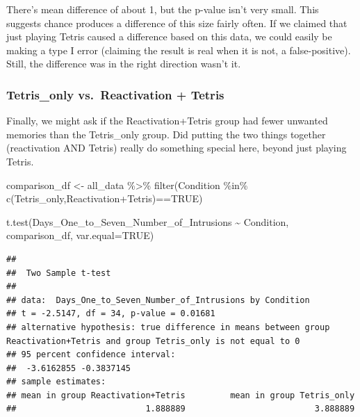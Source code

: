 \documentclass[
]{book}
\newenvironment{Shaded}{\begin{snugshade}}{\end{snugshade}}
\newcommand{\AttributeTok}[1]{\textcolor[rgb]{0.77,0.63,0.00}{#1}}
\newcommand{\ConstantTok}[1]{\textcolor[rgb]{0.00,0.00,0.00}{#1}}
\newcommand{\FunctionTok}[1]{\textcolor[rgb]{0.00,0.00,0.00}{#1}}
\newcommand{\NormalTok}[1]{#1}
\newcommand{\OtherTok}[1]{\textcolor[rgb]{0.56,0.35,0.01}{#1}}
\newcommand{\SpecialCharTok}[1]{\textcolor[rgb]{0.00,0.00,0.00}{#1}}
\newcommand{\StringTok}[1]{\textcolor[rgb]{0.31,0.60,0.02}{#1}}
\begin{document}
There's mean difference of about 1, but the p-value isn't very small. This suggests chance produces a difference of this size fairly often. If we claimed that just playing Tetris caused a difference based on this data, we could easily be making a type I error (claiming the result is real when it is not, a false-positive). Still, the difference was in the right direction wasn't it.

\hypertarget{tetris_only-vs.-reactivation-tetris}{%
\subsubsection{Tetris\_only vs.~Reactivation + Tetris}\label{tetris_only-vs.-reactivation-tetris}}

Finally, we might ask if the Reactivation+Tetris group had fewer unwanted memories than the Tetris\_only group. Did putting the two things together (reactivation AND Tetris) really do something special here, beyond just playing Tetris.

\begin{Shaded}
\begin{Highlighting}[]
\NormalTok{comparison\_df }\OtherTok{\textless{}{-}}\NormalTok{ all\_data }\SpecialCharTok{\%\textgreater{}\%} 
                  \FunctionTok{filter}\NormalTok{(Condition }\SpecialCharTok{\%in\%} \FunctionTok{c}\NormalTok{(}\StringTok{\textquotesingle{}Tetris\_only\textquotesingle{}}\NormalTok{,}\StringTok{\textquotesingle{}Reactivation+Tetris\textquotesingle{}}\NormalTok{)}\SpecialCharTok{==}\ConstantTok{TRUE}\NormalTok{)}
                        
\FunctionTok{t.test}\NormalTok{(Days\_One\_to\_Seven\_Number\_of\_Intrusions }\SpecialCharTok{\textasciitilde{}}\NormalTok{ Condition, }
\NormalTok{       comparison\_df,}
       \AttributeTok{var.equal=}\ConstantTok{TRUE}\NormalTok{)}
\end{Highlighting}
\end{Shaded}

\begin{verbatim}
## 
##  Two Sample t-test
## 
## data:  Days_One_to_Seven_Number_of_Intrusions by Condition
## t = -2.5147, df = 34, p-value = 0.01681
## alternative hypothesis: true difference in means between group Reactivation+Tetris and group Tetris_only is not equal to 0
## 95 percent confidence interval:
##  -3.6162855 -0.3837145
## sample estimates:
## mean in group Reactivation+Tetris         mean in group Tetris_only 
##                          1.888889                          3.888889
\end{verbatim}
\end{document}
